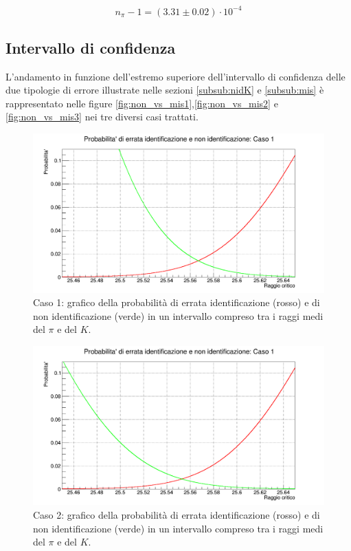 \documentclass[8pt]{extarticle}
\begin{document}
\begin{equation}
n_{\pi} -1 = (3.31 \pm 0.02) \cdot 10^{-4}
\nonumber
\end{equation}

\subsection{Intervallo di confidenza}
L'andamento in funzione dell'estremo superiore dell'intervallo di confidenza delle due tipologie di errore illustrate nelle sezioni \ref{subsub:nidK} e \ref{subsub:mis} è rappresentato nelle figure \ref{fig:non_vs_mis1},\ref{fig:non_vs_mis2} e \ref{fig:non_vs_mis3}  nei tre diversi casi trattati. \\

\begin{figure}
\begin{center}
\includegraphics[scale=0.4]{non_vs_mis1DEFINITIVO}
\caption{Caso 1: grafico della probabilità di errata identificazione (rosso) e di non identificazione (verde) in un intervallo compreso tra i raggi medi del $\pi$ e del $K$.}
\end{center}
\end{figure}

\begin{figure}
\begin{center}
\includegraphics[scale=0.4]{non_vs_mis2DEFINITIVO}
\caption{Caso 2: grafico della probabilità di errata identificazione (rosso) e di non identificazione (verde) in un intervallo compreso tra i raggi medi del $\pi$ e del $K$.}
\end{center}
\end{figure}
\end{document}
